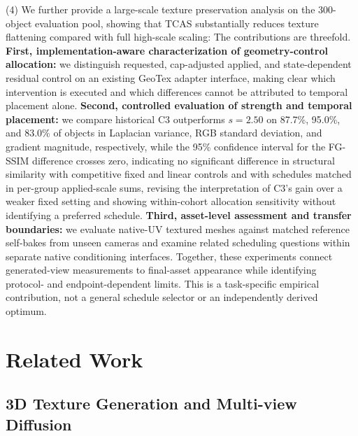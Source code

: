 \documentclass[times,twocolumn,final]{elsarticle}
\providecommand{\DIFadd}[1]{{\protect\color{blue} \sf #1}} %
\providecommand{\DIFdel}[1]{{\protect\color{red} \scriptsize #1}} %
\providecommand{\DIFaddbegin}{} %
\providecommand{\DIFaddend}{} %
\providecommand{\DIFdelbegin}{} %
\providecommand{\DIFdelend}{} %
\begin{document}
\DIFdelbegin \DIFdel{(4) We further provide a large-scale texture preservation analysis on the 300-object evaluation pool, showing that TCAS substantially reduces texture flattening compared with full high-scale scaling: }\DIFdelend \DIFaddbegin \DIFadd{The contributions are threefold. \textbf{First, implementation-aware characterization of geometry-control allocation:} we distinguish requested, cap-adjusted applied, and state-dependent residual control on an existing GeoTex adapter interface, making clear which intervention is executed and which differences cannot be attributed to temporal placement alone. \textbf{Second, controlled evaluation of strength and temporal placement:} we compare historical }\DIFaddend C3 \DIFdelbegin \DIFdel{outperforms $s = 2.50$ on 87.7\%, 95.0\%, and 83.0\% of objects in Laplacian variance, RGB standard deviation, and gradient magnitude, respectively, while the 95\% confidence interval for the FG-SSIM difference crosses zero, indicating no significant difference in structural similarity}\DIFdelend \DIFaddbegin \DIFadd{with competitive fixed and linear controls and with schedules matched in per-group applied-scale sums, revising the interpretation of C3's gain over a weaker fixed setting and showing within-cohort allocation sensitivity without identifying a preferred schedule. \textbf{Third, asset-level assessment and transfer boundaries:} we evaluate native-UV textured meshes against matched reference self-bakes from unseen cameras and examine related scheduling questions within separate native conditioning interfaces. Together, these experiments connect generated-view measurements to final-asset appearance while identifying protocol- and endpoint-dependent limits. This is a task-specific empirical contribution, not a general schedule selector or an independently derived optimum}\DIFaddend .

\section{Related Work}
\label{sec:related}

\subsection{3D Texture Generation and Multi-view Diffusion}
\label{subsec:3dtex}
\end{document}
